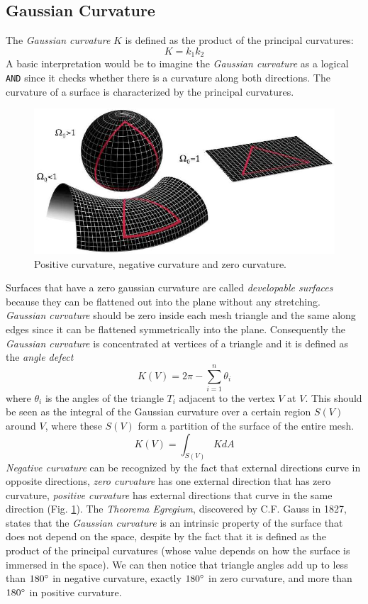 \subsection{Gaussian Curvature} \label{section:gaussian-curvature-intro}
The \textit{Gaussian curvature} $K$ is defined as the product of the principal curvatures:
$$K=k_1k_2$$
A basic interpretation would be to imagine the \textit{Gaussian curvature} as a logical \texttt{AND} since it checks whether there is a curvature along both directions.
The curvature of a surface is characterized by the principal curvatures.
\cite{WEBSITE:gaussiancurvaturedirty}
\begin{figure}[!h]
  \centering
\includegraphics[scale=0.5]{images/gaussian_curvature_examples.png}
\caption{Positive curvature, negative curvature and zero curvature.}\label{fig:curvature-gaussian}
\end{figure}
Surfaces that have a zero gaussian curvature are called \textit{developable surfaces} because they can be flattened out into the plane without any stretching. \textit{Gaussian curvature} should be zero inside each mesh triangle and the same along edges since it can be flattened symmetrically into the plane. Consequently the \textit{Gaussian curvature} is concentrated at vertices of a triangle and it is defined as the \textit{angle defect}
$$K(V) = 2 \pi - \sum_{i=1}^n \theta_i$$
where $\theta_i$ is the angles of the triangle $T_i$ adjacent to the vertex $V$ at $V$. This should be seen as the integral of the Gaussian curvature over a certain region $S(V)$ around $V$, where these $S(V)$ form a partition of the surface of the entire mesh.
$$ K(V) = \int_{S(V)} KdA  $$
\textit{Negative curvature} can be recognized by the fact that external directions curve in opposite directions, \textit{zero curvature} has one external direction that has zero curvature, \textit{positive curvature} has external directions that curve in the same direction (Fig. \ref{fig:curvature-gaussian}).
The \textit{Theorema Egregium}, discovered by C.F. Gauss in 1827, states that the \textit{Gaussian curvature} is an intrinsic property of the surface that does not depend on the space, despite by the fact that it is defined as the product of the principal curvatures (whose value depends on how the surface is immersed in the space).
We can then notice that triangle angles add up to less than $180 \degree$ in negative curvature, exactly $180 \degree$ in zero curvature, and more than $180 \degree$ in positive curvature.
\cite{geometryprocessing}

